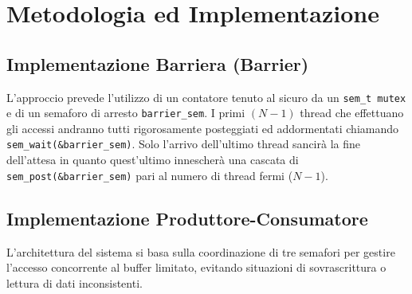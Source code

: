 \documentclass[a4paper,12pt]{article}
\begin{document}
\section{Metodologia ed Implementazione}

\subsection{Implementazione Barriera (Barrier)}
L'approccio prevede l'utilizzo di un contatore tenuto al sicuro da un \texttt{sem\_t mutex} e di un semaforo di arresto \texttt{barrier\_sem}.
I primi $(N-1)$ thread che effettuano gli accessi andranno tutti rigorosamente posteggiati ed addormentati chiamando \texttt{sem\_wait(\&barrier\_sem)}.
Solo l'arrivo dell'ultimo thread sancirà la fine dell'attesa in quanto quest'ultimo innescherà una cascata di \texttt{sem\_post(\&barrier\_sem)} pari al numero di thread fermi ($N-1$).

\subsection{Implementazione Produttore-Consumatore}
L'architettura del sistema si basa sulla coordinazione di tre semafori per gestire l'accesso concorrente al buffer limitato, evitando situazioni di sovrascrittura o lettura di dati inconsistenti.
\end{document}
